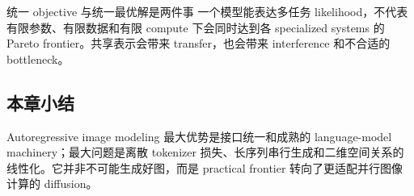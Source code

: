 
\begin{warningbox}{统一 objective 与统一最优解是两件事}
一个模型能表达多任务 likelihood，不代表有限参数、有限数据和有限 compute 下会同时达到各 specialized systems 的 Pareto frontier。共享表示会带来 transfer，也会带来 interference 和不合适的 bottleneck。
\end{warningbox}


\subsection{本章小结}

Autoregressive image modeling 最大优势是接口统一和成熟的 language-model machinery；最大问题是离散 tokenizer 损失、长序列串行生成和二维空间关系的线性化。它并非不可能生成好图，而是 practical frontier 转向了更适配并行图像计算的 diffusion。

